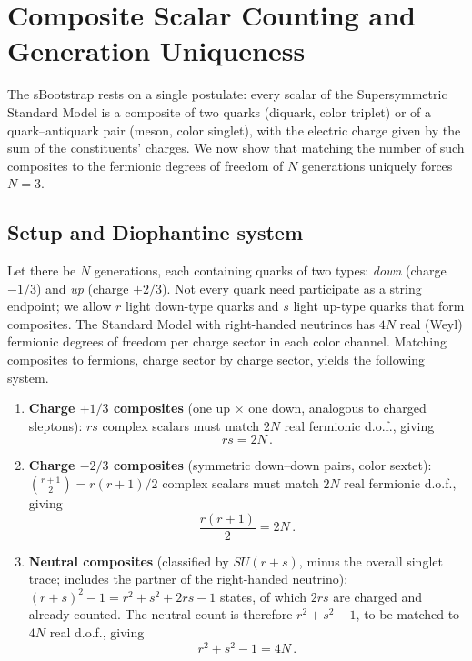 \documentclass[12pt,a4paper]{article}
\begin{document}
\section{Composite Scalar Counting and Generation Uniqueness}
\label{sec:counting}

The sBootstrap rests on a single postulate: every scalar of the
Supersymmetric Standard Model is a composite of two quarks (diquark,
color triplet) or of a quark--antiquark pair (meson, color singlet),
with the electric charge given by the sum of the constituents' charges.
We now show that matching the number of such composites to the
fermionic degrees of freedom of $N$ generations uniquely forces
$N = 3$.

\subsection{Setup and Diophantine system}
Let there be $N$ generations, each containing quarks of two types:
\emph{down} (charge $-1/3$) and \emph{up} (charge $+2/3$).  Not
every quark need participate as a string endpoint; we allow
$r$ light down-type quarks and $s$ light up-type quarks that form
composites.  The Standard Model with right-handed neutrinos has
$4N$ real (Weyl) fermionic degrees of freedom per charge sector in
each color channel.  Matching composites to fermions, charge sector
by charge sector, yields the following system.

\begin{enumerate}
\item \textbf{Charge $+1/3$ composites} (one up $\times$ one down,
analogous to charged sleptons): $rs$ complex scalars must match
$2N$ real fermionic d.o.f., giving
\begin{equation}
\label{eq:rs}
rs = 2N\,.
\end{equation}

\item \textbf{Charge $-2/3$ composites} (symmetric down--down pairs,
color sextet): $\binom{r+1}{2} = r(r+1)/2$ complex scalars must
match $2N$ real fermionic d.o.f., giving
\begin{equation}
\label{eq:rr}
\frac{r(r+1)}{2} = 2N\,.
\end{equation}

\item \textbf{Neutral composites} (classified by $SU(r+s)$, minus
the overall singlet trace; includes the partner of the right-handed
neutrino): $(r+s)^2 - 1 = r^2 + s^2 + 2rs - 1$ states, of which
$2rs$ are charged and already counted.  The neutral count is therefore
$r^2 + s^2 - 1$, to be matched to $4N$ real d.o.f., giving
\begin{equation}
\label{eq:neutral}
r^2 + s^2 - 1 = 4N\,.
\end{equation}
\end{enumerate}
\end{document}
